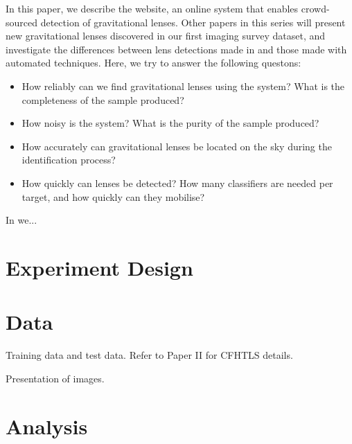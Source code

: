 \documentclass[useAMS,usenatbib,a4paper]{mn2e}
\begin{document}
In this paper, we describe the \sw website, an online system that
enables crowd-sourced detection of gravitational lenses. 
Other papers in this series will present new gravitational lenses
discovered in our first imaging survey dataset, and investigate the
differences between lens detections made in \sw and those made with
automated techniques. Here, we try to answer the following questons:
\begin{itemize}

\item How reliably can we find gravitational lenses using the \sw
system? What is the completeness of the sample produced?

\item How noisy is the system? What is the purity of the sample
produced?

\item How accurately can gravitational lenses be located on the sky
during the identification process?

\item How quickly can lenses be detected? How many classifiers are
needed per target, and how quickly can they mobilise?

\end{itemize}

In  we...




\section{Experiment Design}
\label{sec:design}



\section{Data}
\label{sec:data}

Training data and test data. Refer to Paper II for CFHTLS details.

Presentation of images.



\section{Analysis}
\label{sec:analysis}
\end{document}
